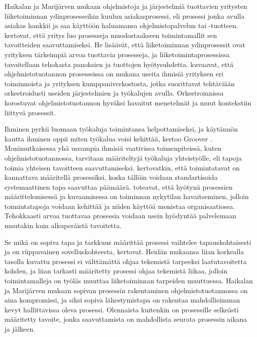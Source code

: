 \documentclass[finnish,12pt,a4paper,pdftex]{article}
\begin{document}
 Haikalan ja Marijärven \citeyearpar{ohjelmistotuotanto} mukaan ohjelmistoja ja järjestelmiä tuottavien yritysten liiketoiminnan ydinprosesseihin kuuluu asiakasprosessi, eli prosessi jonka avulla asiakas hankkii ja saa käyttöön haluamansa ohjelmistopalvelun tai -tuotteen. \citeauthor{teollisuustalous} \citeyearpar{teollisuustalous} kertovat, että yritys luo prosesseja muodostaakseen toimintamallit sen tavoitteiden saavuttamiseksi. He lisäävät, että liiketoiminnan ydinprosessit ovat yrityksen tärkeimpiä arvoa tuottavia prosesseja, ja liiketoimintaprosessissa tavoitellaan tehokasta panoksien ja tuottojen hyötysuhdetta. \citeauthor{okaytannot} \citeyearpar{okaytannot} kuvaavat, että ohjelmistotuotannon prosesseissa on mukana useita ihmisiä yrityksen eri toiminnoista ja yrityksen kumppaniverkostosta, jotka suorittavat tehtäviään orkestroidusti useiden järjestelmien ja työkalujen avulla. Orkestroinnissa korostuvat ohjelmistotuotannon hyväksi havaitut menetelmät ja muut kontekstiin liittyvä prosessit.
 
Ihminen pyrkii luomaan työkaluja toimintansa helpottamiseksi, ja käytännön kautta ihminen oppii miten työkalua voisi kehittää, kertoo Groover \citeyearpar{groover}. Monimutkaisessa yhä useampia ihmisiä vaativissa toimenpiteissä, kuten ohjelmistotuotannossa, tarvitaan määriteltyjä työkaluja yhteistyölle, eli tapoja toimia yhteisen tavoitteen saavuttamiseksi. \citeauthor{leanit} \citeyearpar{leanit} kertovatkin, että toimintatavat on kannattava määritellä prosessiksi, koska tällöin voidaan standartisoida systemaattinen tapa saavuttaa päämäärä. \citeauthor{leanit} toteavat, että hyötynä prosessien määrittelemisessä ja kuvaamisessa on toiminnan nykytilan havaitseminen, jolloin toimintatapoja voidaan kehittää ja niiden käyttöä monistaa organisaatiossa. Tehokkaasti arvoa tuottavaa prosessia voidaan usein hyödyntää palvelemaan muutakin kuin alkuperäistä tavoitetta.

Se mikä on sopiva tapa ja tarkkuus määrittää prosessi vaihtelee tapauskohtaisesti ja on riippuvainen sovelluskohteesta, \cite{ohjelmistotuotanto} kertovat. Heidän mukaansa liian korkealla tasolla kuvattu prosessi ei välttämättä ohjaa tekemistä tarpeeksi laatutavoitetta kohden, ja liian tarkasti määritetty prosessi ohjaa tekemistä liikaa, jolloin toimintamalleja on työläs muuttaa liiketoiminnan tarpeiden muuttuessa. Haikalan ja Marijärven mukaan sopivan prosessin rakentaminen ohjelmistotuotannossa on aina kompromissi, ja siksi sopiva lähestymistapa on rakentaa mahdollisimman kevyt hallittavissa oleva prosessi. Olennaista kuitenkin on prosessille selkeästi määritetty tavoite, jonka saavuttamista on mahdollista seurata prosessin aikana ja jälkeen. 
\end{document}
